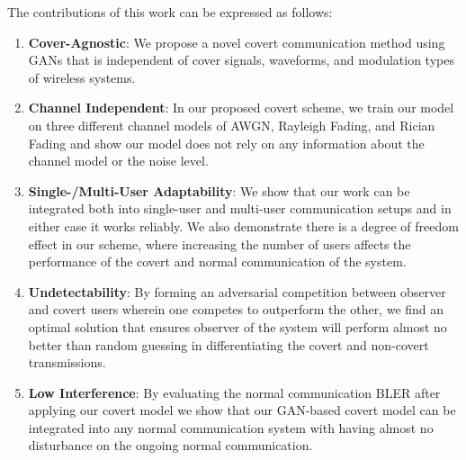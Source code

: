 The contributions of this work can be expressed as follows:
\begin{enumerate}
	\item \textbf{Cover-Agnostic}: We propose a novel covert communication method using GANs that is independent of cover signals, waveforms, and modulation types of wireless systems.
	\item \textbf{Channel Independent}: In our proposed covert scheme, we train our model on three different channel models of AWGN, Rayleigh Fading, and Rician Fading and show our model does not rely on any information about the channel model or the noise level.
	\item \textbf{Single-/Multi-User Adaptability}: We show that our work can be integrated both into single-user and multi-user communication setups and in either case it works reliably. We also demonstrate there is a degree of freedom effect in our scheme, where increasing the number of users affects the performance of the covert and normal communication of the system.
	\item \textbf{Undetectability}: By forming an adversarial competition between observer and covert users wherein one competes to outperform the other, we find an optimal solution that ensures observer of the system will perform almost no better than random guessing in differentiating the covert and non-covert transmissions.
	\item \textbf{Low Interference}: By evaluating the normal communication BLER after applying our covert model we show that our GAN-based covert model can be integrated into any normal communication system with having almost no disturbance on the ongoing normal communication.
\end{enumerate}
